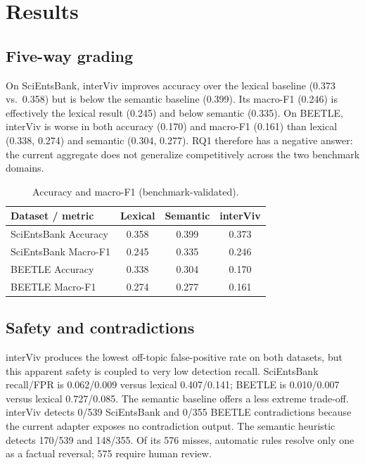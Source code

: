 \documentclass[conference,a4paper]{IEEEtran}
\begin{document}
\section{Results}

\subsection{Five-way grading}

On SciEntsBank, interViv improves accuracy over the lexical baseline (0.373
vs.\ 0.358) but is below the semantic baseline (0.399). Its macro-F1 (0.246) is
effectively the lexical result (0.245) and below semantic (0.335). On BEETLE,
interViv is worse in both accuracy (0.170) and macro-F1 (0.161) than lexical
(0.338, 0.274) and semantic (0.304, 0.277). RQ1 therefore has a negative answer:
the current aggregate does not generalize competitively across the two
benchmark domains.

\begin{table}[t]
\caption{Accuracy and macro-F1 (benchmark-validated).}
\label{tab:grading}
\centering
\small
\begin{tabular}{@{}lccc@{}}
\toprule
Dataset / metric & Lexical & Semantic & interViv \\
\midrule
SciEntsBank Accuracy & 0.358 & 0.399 & 0.373 \\
SciEntsBank Macro-F1 & 0.245 & 0.335 & 0.246 \\
BEETLE Accuracy      & 0.338 & 0.304 & 0.170 \\
BEETLE Macro-F1      & 0.274 & 0.277 & 0.161 \\
\bottomrule
\end{tabular}
\end{table}

\subsection{Safety and contradictions}

interViv produces the lowest off-topic false-positive rate on both datasets,
but this apparent safety is coupled to very low detection recall. SciEntsBank
recall/FPR is 0.062/0.009 versus lexical 0.407/0.141; BEETLE is 0.010/0.007
versus lexical 0.727/0.085. The semantic baseline offers a less extreme
trade-off. interViv detects 0/539 SciEntsBank and 0/355 BEETLE contradictions
because the current adapter exposes no contradiction output. The semantic
heuristic detects 170/539 and 148/355. Of its 576 misses, automatic rules
resolve only one as a factual reversal; 575 require human review.
\end{document}
